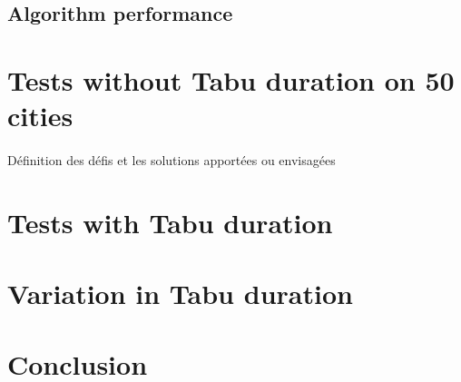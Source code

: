 \documentclass[12pt,oneside,a4paper]{article}
\begin{document}
\subsection{Algorithm performance}



\section{Tests without Tabu duration on 50 cities}
\paragraph{}
Définition des défis et les solutions apportées ou envisagées

\section{Tests with Tabu duration}

\section{Variation in Tabu duration}

\section{Conclusion}
\paragraph{}
\end{document}
